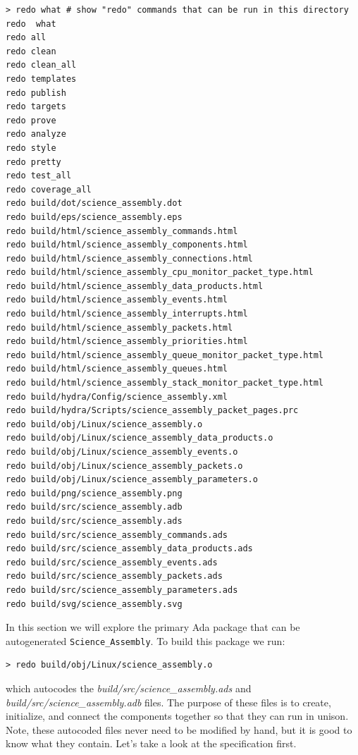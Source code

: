 \vspace{5mm} %
\begin{verbatim}
> redo what # show "redo" commands that can be run in this directory
redo  what
redo all
redo clean
redo clean_all
redo templates
redo publish
redo targets
redo prove
redo analyze
redo style
redo pretty
redo test_all
redo coverage_all
redo build/dot/science_assembly.dot
redo build/eps/science_assembly.eps
redo build/html/science_assembly_commands.html
redo build/html/science_assembly_components.html
redo build/html/science_assembly_connections.html
redo build/html/science_assembly_cpu_monitor_packet_type.html
redo build/html/science_assembly_data_products.html
redo build/html/science_assembly_events.html
redo build/html/science_assembly_interrupts.html
redo build/html/science_assembly_packets.html
redo build/html/science_assembly_priorities.html
redo build/html/science_assembly_queue_monitor_packet_type.html
redo build/html/science_assembly_queues.html
redo build/html/science_assembly_stack_monitor_packet_type.html
redo build/hydra/Config/science_assembly.xml
redo build/hydra/Scripts/science_assembly_packet_pages.prc
redo build/obj/Linux/science_assembly.o
redo build/obj/Linux/science_assembly_data_products.o
redo build/obj/Linux/science_assembly_events.o
redo build/obj/Linux/science_assembly_packets.o
redo build/obj/Linux/science_assembly_parameters.o
redo build/png/science_assembly.png
redo build/src/science_assembly.adb
redo build/src/science_assembly.ads
redo build/src/science_assembly_commands.ads
redo build/src/science_assembly_data_products.ads
redo build/src/science_assembly_events.ads
redo build/src/science_assembly_packets.ads
redo build/src/science_assembly_parameters.ads
redo build/svg/science_assembly.svg
\end{verbatim}
\vspace{5mm} %

In this section we will explore the primary Ada package that can be autogenerated \texttt{Science\_Assembly}. To build this package we run:

\vspace{5mm} %
\begin{verbatim}
> redo build/obj/Linux/science_assembly.o
\end{verbatim}
\vspace{5mm} %

which autocodes the \textit{build/src/science\_assembly.ads} and \textit{build/src/science\_assembly.adb} files. The purpose of these files is to create, initialize, and connect the components together so that they can run in unison. Note, these autocoded files never need to be modified by hand, but it is good to know what they contain. Let's take a look at the specification first. \\

